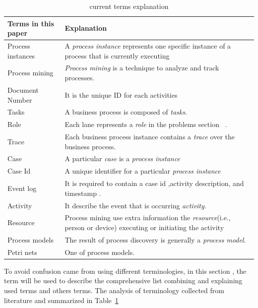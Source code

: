 \begin{table}[htb]
\footnotesize	 %
\begin{tabularx}{\textwidth}{X X}

\hline
Terms in this paper   & Explanation \\
\hline
Process instances & A \textit{process instance} represents one specific instance of a process that is currently executing \\
\hline
Process mining & \textit{Process mining} is a technique to analyze and track processes.\\
\hline
Document Number & It is the unique ID for each activities  \\
\hline
Tasks & A business process is composed of \textit{tasks}. \\
\hline
Role & Each lane represents a \textit{role} in the problems section~\pageref{figure:soAndfieldservice}  . \\
\hline
Trace & Each business process instance contains a \textit{trace} over the business process. \\
\hline
Case &  A particular \textit{case} is a \textit{process instance} \\ 
\hline
Case Id & A unique identifier for a particular \textit{process instance}\\
\hline
Event log & It is required to contain a case id ,activity description, and timestamp . \\
\hline
Activity & It describe the event that is occurring \textit{activity}. \\
\hline
Resource & Process mining use extra information the \textit{resource}(i.e., person or device) executing or initiating the activity \\
\hline
Process models & The result of process discovery is generally a \textit{process model}. \\
\hline
Petri nets & One of process models. \\
\hline

\end{tabularx}
\caption{current terms explanation}
\label{table:terminology}
\end{table}


To avoid confusion came from using different terminologies, in this section , the term will be used to describe the comprehensive list  combining and explaining used terms and others terms. The analysis of terminology collected from literature and summarized in Table~\ref{table:terminology}




